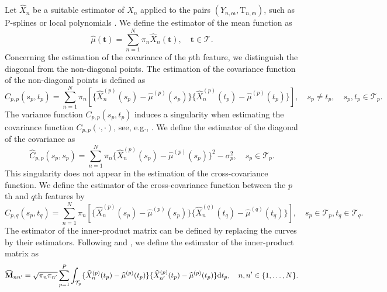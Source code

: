 \documentclass[times,sort&compress,3p]{elsarticle}
\theoremstyle{plain}%
\theoremstyle{definition}
\newcommand{\dd}{{\rm d}}
\newcommand{\TT}[1]{\mathcal{T}_{#1}} %
\newcommand{\pointt}{\mathbf{t}} %
\newcommand{\hatXnp}[1]{\widehat{X}_n^{(#1)}} %
\newcommand{\hatmup}[1]{\widehat{\mu}^{(#1)}} %
\begin{document}
Let $\widehat{X}_n$ be a suitable estimator of $X_n$ applied to the pairs $(Y_{n, \mathsf{m}}, \mathrm{T}_{n, \mathsf{m}})$, such as P-splines \cite{eilersTwentyYearsPsplines2015} or local polynomials \cite{fanLocalPolynomialModelling1996}. We define the estimator of the mean function as
\begin{equation}
    \widehat{\mu}(\pointt) = \sum_{n = 1}^N \pi_n \widehat{X}_n(\pointt), \quad \pointt \in \TT{}.
\end{equation}
Concerning the estimation of the covariance of the $p$th feature, we distinguish the diagonal from the non-diagonal points. The estimation of the covariance function of the non-diagonal points is defined as
\begin{equation}\label{eq:cov_estimation}
    \widehat{C}_{p, p}(s_p, t_p) = \sum_{n = 1}^N \pi_n\left[\{\hatXnp{p}(s_p) - \hatmup{p}(s_p)\}\{\hatXnp{p}(t_p) - \hatmup{p}(t_p)\}\right], \quad s_p \neq t_p, \quad s_p, t_p \in \TT{p}.
\end{equation}
The variance function $C_{p, p}(s_p, t_p)$ induces a singularity when estimating the covariance function $C_{p, p}(\cdot, \cdot)$, see, e.g., \cite{yaoFunctionalDataAnalysis2005,zhangSparseDenseFunctional2016}. We define the estimator of the diagonal of the covariance as
\begin{equation}\label{eq:Cpp}
    \widehat{C}_{p, p}(s_p, s_p) = \sum_{n = 1}^N \pi_n\{\hatXnp{p}(s_p) - \hatmup{p}(s_p)\}^2 - \sigma_p^2, \quad s_p \in \TT{p}.
\end{equation}
This singularity does not appear in the estimation of the cross-covariance function. We define the estimator of the cross-covariance function between the $p$th and $q$th features by
\begin{equation}
    \widehat{C}_{p, q}(s_p, t_q) = \sum_{n = 1}^N \pi_n\left[\{\hatXnp{p}(s_p) - \hatmup{p}(s_p)\}\{\hatXnp{q}(t_q) - \hatmup{q}(t_q)\}\right], \quad s_p \in \TT{p}, t_q \in \TT{q}.
\end{equation}
The estimator of the inner-product matrix can be defined by replacing the curves by their estimators. Following \cite{benkoCommonFunctionalPrincipal2009} and \cite{grithFunctionalPrincipalComponent2018}, we define the estimator of the inner-product matrix as
\begin{equation}
    \widehat{\mathbf{M}}_{nn^\prime} = \sqrt{\pi_n \pi_{n^{\prime}}}\sum_{p = 1}^P \int_{\TT{p}}\{\hatXnp{p}(t_p) - \widehat{\mu}^{(p)}(t_p)\}\{\widehat{X}^{(p)}_{n^\prime}(t_p) - \widehat{\mu}^{(p)}(t_p)\} \dd t_p, \quad n, n^\prime \in \{1, \dots, N\}.
\end{equation}
\end{document}
